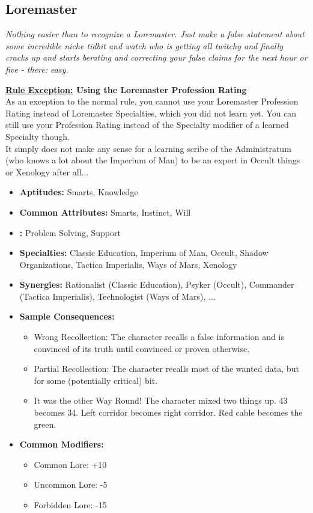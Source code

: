 \subsection{Loremaster}\label{Loremaster}
\textit{Nothing easier than to recognize a Loremaster.
Just make a false statement about some incredible niche tidbit and watch who is getting all twitchy and finally cracks up and starts berating and correcting your false claims for the next hour or five - there: easy.}
\begin{DndReadAloud}
\textbf{\underline{Rule Exception:} Using the Loremaster Profession Rating}\\
As an exception to the normal rule, you cannot use your Loremaster Profession Rating instead of Loremaster Specialties, which you did not learn yet. You can still use your Profession Rating instead of the Specialty modifier of a learned Specialty though.\\
It simply does not make any sense for a learning scribe of the Administratum (who knows a lot about the Imperium of Man) to be an expert in Occult things or Xenology after all...
\end{DndReadAloud}
\begin{itemize}
	\item \textbf{Aptitudes:} Smarts, Knowledge
	\item \textbf{Common Attributes:} Smarts, Instinct, Will
	\item \textbf{:} Problem Solving, Support
	\item \textbf{Specialties:} Classic Education, Imperium of Man, Occult, Shadow Organizations, Tactica Imperialis, Ways of Mars, Xenology
	\item \textbf{Synergies:} Rationalist (Classic Education), Psyker (Occult), Commander (Tactica Imperialis), Technologist (Ways of Mars), ...
	\item \textbf{Sample Consequences:} 
	\begin{itemize}
		\item Wrong Recollection: The character recalls a false information and is convinced of its truth until convinced or proven otherwise.
		\item Partial Recollection: The character recalls most of the wanted data, but for some (potentially critical) bit.
		\item It was the other Way Round! The character mixed two things up. 43 becomes 34. Left corridor becomes right corridor. Red cable becomes the green.
	\end{itemize}
	\item \textbf{Common Modifiers:}
	\begin{itemize}
		\item Common Lore: +10
		\item Uncommon Lore: -5
		\item Forbidden Lore: -15
	\end{itemize}
\end{itemize}

